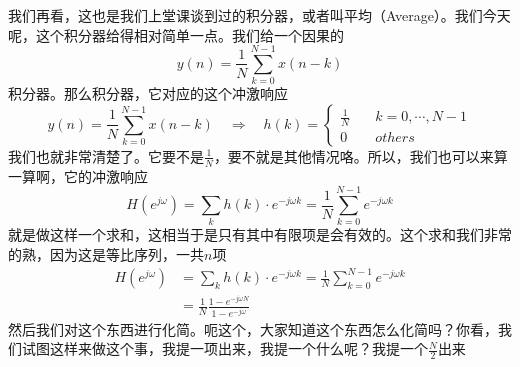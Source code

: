 \documentclass[a4paper,12pt]{article}
\begin{document}
我们再看，这也是我们上堂课谈到过的积分器，或者叫平均（Average）。我们今天呢，这个积分器给得相对简单一点。我们给一个因果的
\begin{equation}
   y(n) = \frac{1}{N}\sum_{k=0}^{N-1}x(n-k)
\end{equation}
积分器。那么积分器，它对应的这个冲激响应
\begin{equation}
   y(n) = \frac{1}{N}\sum_{k=0}^{N-1}x(n-k)\quad\Longrightarrow\quad h(k) = \left\{\begin{matrix}
 \frac{1}{N} & \quad k=0,\cdots ,N-1\\
0& \quad others
\end{matrix}\right.
\end{equation}
我们也就非常清楚了。它要不是$\frac{1}{N}$，要不就是其他情况咯。所以，我们也可以来算一算啊，它的冲激响应
\begin{equation}
   H\left (  e^{j\omega} \right ) = \sum_k h(k)\cdot e^{-j\omega k} = \frac{1}{N}\sum_{k=0}^{N-1}e^{-j \omega k}
\end{equation}
就是做这样一个求和，这相当于是只有其中有限项是会有效的。这个求和我们非常的熟，因为这是等比序列，一共$n$项
\begin{equation}
\begin{aligned}
   H\left (  e^{j\omega} \right ) &= \sum_k h(k)\cdot e^{-j\omega k} = \frac{1}{N}\sum_{k=0}^{N-1}e^{-j \omega k}\\
&=\frac{1}{N}\frac{1-e^{-j\omega N}}{1-e^{-j\omega }}
\end{aligned}
\end{equation}
然后我们对这个东西进行化简。呃这个，大家知道这个东西怎么化简吗？你看，我们试图这样来做这个事，我提一项出来，我提一个什么呢？我提一个$\frac{N}{2}$出来
\end{document}

